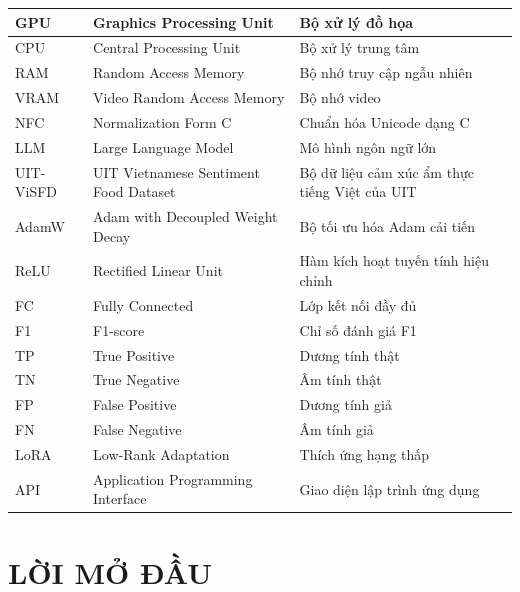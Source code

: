 \documentclass[14pt, a4paper]{report}
\begin{document}
\begin{longtable}{|>{\raggedright\arraybackslash}p{2.0cm}|>{\raggedright\arraybackslash}p{5.6cm}|>{\raggedright\arraybackslash}p{6.4cm}|}
\hline
GPU & Graphics Processing Unit & Bộ xử lý đồ họa \\
\hline
CPU & Central Processing Unit & Bộ xử lý trung tâm \\
\hline
RAM & Random Access Memory & Bộ nhớ truy cập ngẫu nhiên \\
\hline
VRAM & Video Random Access Memory & Bộ nhớ video \\
\hline
NFC & Normalization Form C & Chuẩn hóa Unicode dạng C \\
\hline
LLM & Large Language Model & Mô hình ngôn ngữ lớn \\
\hline
UIT-ViSFD & UIT Vietnamese Sentiment Food Dataset & Bộ dữ liệu cảm xúc ẩm thực tiếng Việt của UIT \\
\hline
AdamW & Adam with Decoupled Weight Decay & Bộ tối ưu hóa Adam cải tiến \\
\hline
ReLU & Rectified Linear Unit & Hàm kích hoạt tuyến tính hiệu chỉnh \\
\hline
FC & Fully Connected & Lớp kết nối đầy đủ \\
\hline
F1 & F1-score & Chỉ số đánh giá F1 \\
\hline
TP & True Positive & Dương tính thật \\
\hline
TN & True Negative & Âm tính thật \\
\hline
FP & False Positive & Dương tính giả \\
\hline
FN & False Negative & Âm tính giả \\
\hline
LoRA & Low-Rank Adaptation & Thích ứng hạng thấp \\
\hline
API & Application Programming Interface & Giao diện lập trình ứng dụng \\
\hline
\end{longtable}

\listoffigures

\listoftables

\pagestyle{mainstyle}

\chapter*{LỜI MỞ ĐẦU}
\end{document}
